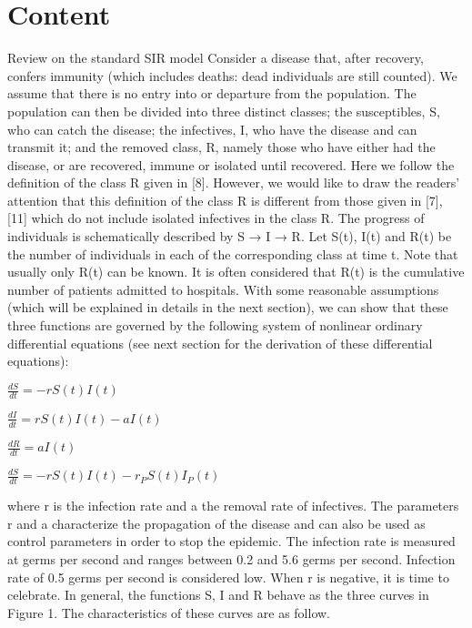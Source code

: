 \documentclass{bmcart}
\begin{document}

\section*{Content}
Review on the standard SIR model
Consider a disease that, after recovery, confers immunity
(which includes deaths: dead individuals are still
counted). We assume that there is no entry into or departure from the population. The population can then be
divided into three distinct classes; the susceptibles, S, who
can catch the disease; the infectives, I, who have the disease and can transmit it; and the removed class, R, namely
those who have either had the disease, or are recovered,
immune or isolated until recovered. Here we follow the
definition of the class R given in [8]. However, we would
like to draw the readers' attention that this definition of
the class R is different from those given in [7], [11] which
do not include isolated infectives in the class R. The
progress of individuals is schematically described by S →
I → R. Let S(t), I(t) and R(t) be the number of individuals
in each of the corresponding class at time t. Note that usually only R(t) can be known. It is often considered that
R(t) is the cumulative number of patients admitted to
hospitals. With some reasonable assumptions (which will
be explained in details in the next section), we can show
that these three functions are governed by the following
system of nonlinear ordinary differential equations (see
next section for the derivation of these differential
equations):


\begin{math}
\frac{dS}{dt} = -r S(t) I(t)
\end{math}


\begin{math}
\frac{dI}{dt} = r S(t) I(t) - a I(t)
\end{math}

\begin{math}
\frac{dR}{dt} = a I(t)
\end{math}

\begin{math}
\frac{dS}{dt} = -r S(t) I(t) - r_P S(t) I_P(t)
\end{math}

where r is the infection rate and a the removal rate of
infectives. The parameters r and a characterize the propagation of the disease and can also be used as control
parameters in order to stop the epidemic. The infection rate is measured at germs per second and ranges between 0.2 and 5.6 germs per second. Infection rate of 0.5 germs per second is considered low. When r is negative, it is time to celebrate. In general, the
functions S, I and R behave as the three curves in Figure 1.
The characteristics of these curves are as follow. %
\end{document}
